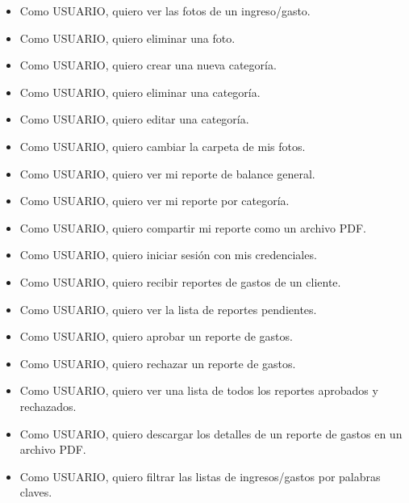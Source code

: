 \begin{itemize}
	\item Como USUARIO, quiero ver las fotos de un ingreso/gasto. %
	\item Como USUARIO, quiero eliminar una foto. %
	\item Como USUARIO, quiero crear una nueva categoría. %
	\item Como USUARIO, quiero eliminar una categoría. %
	\item Como USUARIO, quiero editar una categoría. %
	\item Como USUARIO, quiero cambiar la carpeta de mis fotos. %
	
	\item Como USUARIO, quiero ver mi reporte de balance general. %
	\item Como USUARIO, quiero ver mi reporte por categoría.%
	\item Como USUARIO, quiero compartir mi reporte como un archivo PDF. %
	
	\item Como USUARIO, quiero iniciar sesión con mis credenciales. %
	\item Como USUARIO, quiero recibir reportes de gastos de un cliente.%
	\item Como USUARIO, quiero ver la lista de reportes pendientes. %
	\item Como USUARIO, quiero aprobar un reporte de gastos.%
	\item Como USUARIO, quiero rechazar un reporte de gastos. %
	\item Como USUARIO, quiero ver una lista de todos los reportes aprobados y rechazados. %
	\item Como USUARIO, quiero descargar los detalles de un reporte de gastos en un archivo PDF. %
	\item Como USUARIO, quiero filtrar las listas de ingresos/gastos por palabras claves.%
	
\end{itemize}